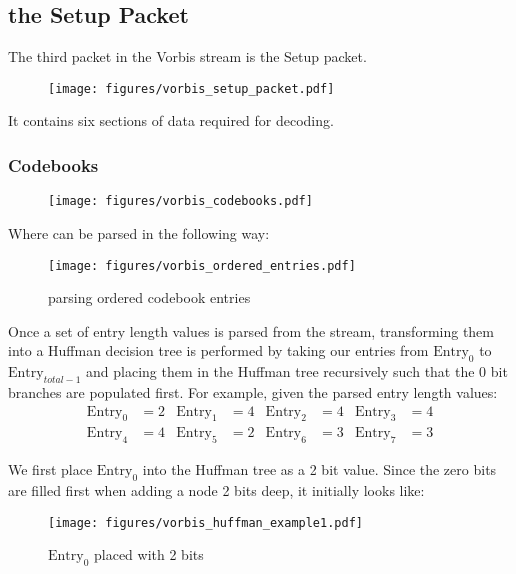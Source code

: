 \subsection{the Setup Packet}

The third packet in the Vorbis stream is the Setup packet.

\begin{figure}[h]
\texttt{[image: figures/vorbis\_setup\_packet.pdf]}
\end{figure}

It contains six sections of data required for decoding.

\subsubsection{Codebooks}

\begin{figure}[h]
\texttt{[image: figures/vorbis\_codebooks.pdf]}
\end{figure}
\par
\noindent
Where  can be parsed in the following way:

\clearpage


\begin{figure}[h]
\texttt{[image: figures/vorbis\_ordered\_entries.pdf]}
\caption{parsing ordered codebook entries}
\end{figure}

Once a set of entry length values is parsed from the stream,
transforming them into a Huffman decision tree
is performed by taking our entries from
$\text{Entry}_0$ to $\text{Entry}_{total - 1}$
and placing them in the Huffman tree recursively such that the 0 bit
branches are populated first.
For example, given the parsed entry length values:
\begin{align*}
\text{Entry}_0 &= 2 & \text{Entry}_1 &= 4 & \text{Entry}_2 &= 4 & \text{Entry}_3 &= 4 \\
\text{Entry}_4 &= 4 & \text{Entry}_5 &= 2 & \text{Entry}_6 &= 3 & \text{Entry}_7 &= 3
\end{align*}
\par
\noindent
We first place $\text{Entry}_0$ into the Huffman tree as a 2 bit value.
Since the zero bits are filled first when adding a node 2 bits deep,
it initially looks like:

\begin{figure}[h]
\texttt{[image: figures/vorbis\_huffman\_example1.pdf]}
\caption{$\text{Entry}_0$ placed with 2 bits}
\end{figure}

